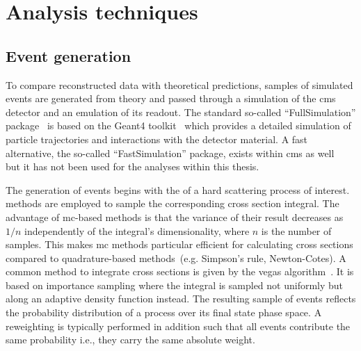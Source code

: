 \chapter{Analysis techniques}


\section{Event generation}
\label{sec:technique-event-gen}

To compare reconstructed data with theoretical predictions, samples of simulated events are generated from theory and passed through a simulation of the \gls{cms} detector and an emulation of its readout. The standard so-called ``FullSimulation'' package~\cite{1742-6596-396-2-022003,1742-6596-664-7-072022} is based on the Geant4 toolkit~\cite{Agostinelli2003250} which provides a detailed simulation of particle trajectories and interactions with the detector material. A fast alternative, the so-called ``FastSimulation'' package, exists within \gls{cms} as well~\cite{fsimRahmat} but it has not been used for the analyses within this thesis.

The generation of events begins with the  of a hard scattering process of interest.  methods are employed to sample the corresponding cross section integral. The advantage of \gls{mc}-based methods is that the variance of their result decreases as $1/n$ independently of the integral's dimensionality, where $n$ is the number of samples. This makes \gls{mc} methods particular efficient for calculating cross sections compared to quadrature-based methods~(e.g. Simpson's rule, Newton-Cotes). A common method to integrate cross sections is given by the \gls{vegas} algorithm~\cite{OHL199913}. It is based on importance sampling where the integral is sampled not uniformly but along an adaptive density function instead. The resulting sample of events reflects the probability distribution of a process over its final state phase space. A reweighting is typically performed in addition such that all events contribute the same probability i.e., they carry the same absolute weight. 

